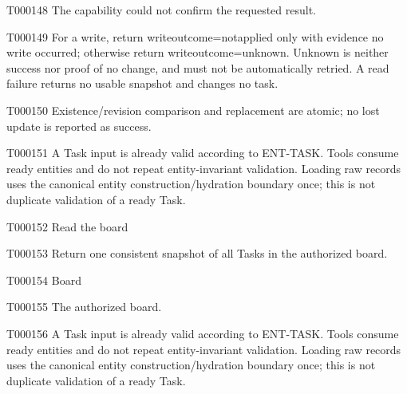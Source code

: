 \documentclass[11pt,a4paper]{article}
\begin{document}
\begin{atlasparagraph}{T000148}
The capability could not confirm the requested result.
\end{atlasparagraph}
\begin{atlasparagraph}{T000149}
For a write, return write\AtlasCharUnderscore{}outcome=not\AtlasCharUnderscore{}applied only with evidence no write occurred; otherwise return write\AtlasCharUnderscore{}outcome=unknown. Unknown is neither success nor proof of no change, and must not be automatically retried. A read failure returns no usable snapshot and changes no task.
\end{atlasparagraph}
\begin{atlasparagraph}{T000150}
Existence/revision comparison and replacement are atomic; no lost update is reported as success.
\end{atlasparagraph}
\begin{atlasparagraph}{T000151}
A Task input is already valid according to ENT-TASK. Tools consume ready entities and do not repeat entity-invariant validation. Loading raw records uses the canonical entity construction/hydration boundary once; this is not duplicate validation of a ready Task.
\end{atlasparagraph}
\begin{atlastext}{T000152}
Read the board
\end{atlastext}
\begin{atlasparagraph}{T000153}
Return one consistent snapshot of all Tasks in the authorized board.
\end{atlasparagraph}
\begin{atlastext}{T000154}
Board
\end{atlastext}
\begin{atlasparagraph}{T000155}
The authorized board.
\end{atlasparagraph}
\begin{atlasparagraph}{T000156}
A Task input is already valid according to ENT-TASK. Tools consume ready entities and do not repeat entity-invariant validation. Loading raw records uses the canonical entity construction/hydration boundary once; this is not duplicate validation of a ready Task.
\end{atlasparagraph}
\end{document}
